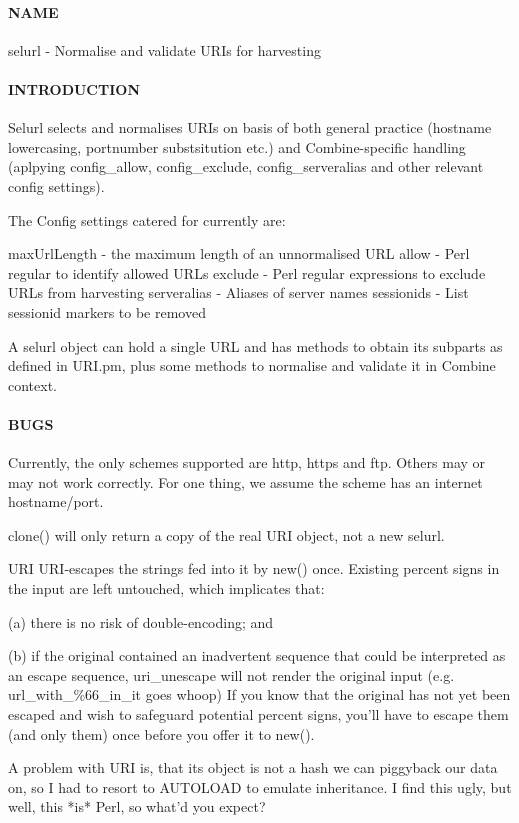 \paragraph{NAME\label{NAME}}


selurl - Normalise and validate URIs for harvesting

\paragraph{INTRODUCTION\label{INTRODUCTION}}


Selurl selects and normalises URIs on basis of both general practice
(hostname lowercasing, portnumber substsitution etc.) and
Combine-specific handling (aplpying config\_allow, config\_exclude,
config\_serveralias and other relevant config settings).



The Config settings catered for currently are:



maxUrlLength - the maximum length of an unnormalised URL
allow - Perl regular to identify allowed URLs
exclude - Perl regular expressions to exclude URLs from harvesting
serveralias - Aliases of server names
sessionids - List sessionid markers to be removed



A selurl object can hold a single URL and has methods to obtain its
subparts as defined in URI.pm, plus some methods to normalise and
validate it in Combine context.

\paragraph{BUGS\label{BUGS}}


Currently, the only schemes supported are http, https and ftp. Others
may or may not work correctly. For one thing, we assume the scheme has
an internet hostname/port.



clone() will only return a copy of the real URI object, not a new
selurl.



URI URI-escapes the strings fed into it by new() once. Existing
percent signs in the input are left untouched, which implicates that:



(a) there is no risk of double-encoding; and



(b) if the original contained an inadvertent sequence that could
be interpreted as an escape sequence, uri\_unescape will not
render the original input (e.g. url\_with\_\%66\_in\_it goes whoop)
If you know that the original has not yet been escaped and wish to
safeguard potential percent signs, you'll have to escape them (and
only them) once before you offer it to new().



A problem with URI is, that its object is not a hash we can
piggyback our data on, so I had to resort to AUTOLOAD to emulate
inheritance. I find this ugly, but well, this *is* Perl, so what'd
you expect?

